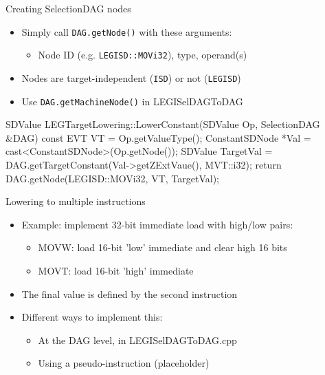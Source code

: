 
\begin{frame}[fragile]{Creating SelectionDAG nodes}

\begin{itemize}
    \item Simply call \texttt{DAG.getNode()} with these arguments:
    \begin{itemize}
        \item Node ID (e.g. \texttt{LEGISD::MOVi32}), type, operand(s)
    \end{itemize}
    \item Nodes are target-independent (\texttt{ISD}) or not (\texttt{LEGISD})
    \item Use \texttt{DAG.getMachineNode()} in LEGISelDAGToDAG
\end{itemize}

\begin{codebox}
SDValue LEGTargetLowering::LowerConstant(SDValue Op,
                                         SelectionDAG &DAG) const {
  EVT VT = Op.getValueType();
  ConstantSDNode *Val = cast<ConstantSDNode>(Op.getNode());
  SDValue TargetVal = DAG.getTargetConstant(Val->getZExtVaue(),
                                            MVT::i32);
  return DAG.getNode(LEGISD::MOVi32, VT, TargetVal);
}
\end{codebox}

\end{frame}


\begin{frame}{Lowering to multiple instructions}

\begin{itemize}
    \item Example: implement 32-bit immediate load with high/low pairs:
    \begin{itemize}
        \item MOVW: load 16-bit 'low' immediate and clear high 16 bits
        \item MOVT: load 16-bit 'high' immediate
    \end{itemize}
    \item The final value is defined by the second instruction
    \item Different ways to implement this:
    \begin{itemize}
        \item At the DAG level, in LEGISelDAGToDAG.cpp
        \item Using a pseudo-instruction (placeholder)
    \end{itemize}
\end{itemize}

\end{frame}

